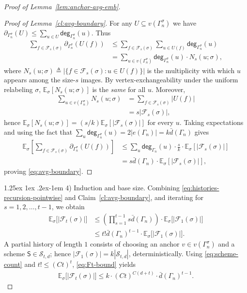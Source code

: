 \documentclass[12pt]{article}
\makeatletter
\newcommand{\s}[1]{\mathsf{#1}}
\renewcommand{\paragraph}{%
  \@startsection{paragraph}{4}%
  {\z@}{1.25ex \@plus 1ex \@minus .2ex}{-1em}%
  {\normalfont\normalsize\bfseries}%
}
\makeatother
\begin{document}
\begin{proof}[Proof of Lemma~\ref{lem:anchor-avg-emb}]
\begin{proof}[Proof of Lemma~\ref{cl:avg-boundary}]
For any $U\subseteq v(\Gamma_n^\sigma)$ we have $\partial_{\Gamma_n^\sigma}(U)\le\sum_{u\in U}\s{deg}_{\Gamma_n^\sigma}(u)$.
Thus
\begin{align}
\sum_{f\in\mathcal F_s(\sigma)} \partial_{\Gamma_n^\sigma}(U(f))
&\leq \sum_{f\in\mathcal F_s(\sigma)} \sum_{u\in U(f)} \s{deg}_{\Gamma_n^\sigma}(u)\\
&=\sum_{u\in v(\Gamma_n^\sigma)} \s{deg}_{\Gamma_n^\sigma}(u)\cdot N_s(u;\sigma),
\end{align}
where $N_s(u;\sigma)\triangleq|\{  f\in\mathcal F_s(\sigma): u\in U(f)  \}|$ is the multiplicity with which $u$ appears among the size-$s$ images.
By vertex-exchangeability under the uniform relabeling $\sigma$, $\mathbb E_\sigma[N_s(u;\sigma)]$ is the \emph{same} for all $u$.
Moreover,
\begin{align}
\sum_{u\in v(\Gamma_n^\sigma)} N_s(u;\sigma)&=\sum_{f\in\mathcal F_s(\sigma)} |U(f)|\\
&=s  |\mathcal F_s(\sigma)|,
\end{align}
hence $\mathbb E_\sigma[N_s(u;\sigma)]=(s/k)  \mathbb E_\sigma[|\mathcal F_s(\sigma)|]$ for every $u$. Taking expectations and using the fact that $\sum_{u}\s{deg}_{\Gamma_n^\sigma}(u)=2|e(\Gamma_n)|=k  \bar{d}(\Gamma_n)$ gives
\begin{align}
\mathbb E_\sigma\left[\sum_{f\in\mathcal F_s(\sigma)} \partial_{\Gamma_n^\sigma}(U(f))\right]
&\leq\sum_{u} \s{deg}_{\Gamma_n}(u)\cdot \frac{s}{k} \cdot \mathbb E_\sigma[  |\mathcal F_s(\sigma)|  ]\\
&=s  \bar{d}(\Gamma_n)\cdot\mathbb E_\sigma[  |\mathcal F_s(\sigma)|  ],
\end{align}
proving \eqref{eq:avg-boundary}.
\end{proof}

\paragraph{4) Induction and base size.}
Combining \eqref{eq:histories-recursion-pointwise} and Claim~\ref{cl:avg-boundary}, and iterating for $s=1,2,\dots,t-1$, we obtain
\begin{align}\label{eq:Ft-bound}
\mathbb E_\sigma\big[  |\mathcal F_t(\sigma)|  \big]
&\leq
\left(\prod_{s=1}^{t-1} s  \bar{d}(\Gamma_n)\right)\cdot \mathbb E_\sigma\big[  |\mathcal F_1(\sigma)|  \big]\\
&\leq t!  \bar{d}(\Gamma_n)^{  t-1}\cdot \mathbb E_\sigma\big[  |\mathcal F_1(\sigma)|  \big].
\end{align}
A partial history of length $1$ consists of choosing an anchor $v\in v(\Gamma_n^\sigma)$ and a scheme $\mathsf S\in\mathcal S_{t,d}$; hence $|\mathcal F_1(\sigma)|=k  |\mathcal S_{t,d}|$, deterministically.
Using \eqref{eq:scheme-count} and $t!\le (Ct)^t$, \eqref{eq:Ft-bound} yields
\begin{align}
\mathbb E_\sigma\big[  |\mathcal F_t(\sigma)|  \big]
\leq
k\cdot (Ct)^{  C(d+t)}\cdot \bar{d}(\Gamma_n)^{  t-1}.
\end{align}


\end{proof}
\end{document}
